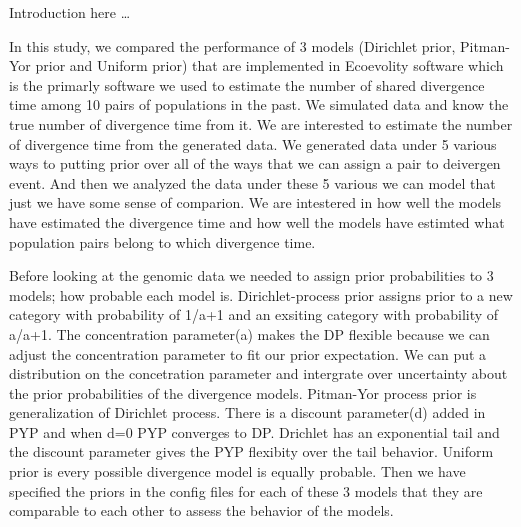 Introduction here \ldots

In this study, we compared the performance of 3 models (Dirichlet prior, Pitman-Yor prior and Uniform prior) 
that are implemented in Ecoevolity software which is the primarly software we used to estimate the number of shared divergence time 
among 10 pairs of populations in the past. We simulated data and know the true number of divergence time from it. We are interested 
to estimate the number of divergence time from the generated data. We generated data under 5 various ways to putting prior over all
 of the ways that we can assign a pair to deivergen event. And then we analyzed the data under these 5 various we can model that 
just we have some sense of comparion. We are intestered in how well the models have estimated the divergence time and how well 
the models have estimted what population pairs belong to which divergence time. 

Before looking at the genomic data we needed to assign prior probabilities to 3 models; how probable each model is. Dirichlet-process prior 
assigns prior to a new category with probability of 1/a+1 and an exsiting category with probability of a/a+1. The concentration parameter(a) 
makes the DP flexible because we can adjust the concentration parameter to fit our prior expectation. We can put a distribution on the 
concetration parameter and intergrate over uncertainty about the prior probabilities of the divergence models. Pitman-Yor process prior is 
generalization of Dirichlet process. There is a discount parameter(d) added in PYP and when d=0 PYP converges to DP. Drichlet has an exponential tail 
and the discount parameter gives the PYP flexibity over the tail behavior. Uniform prior is every possible divergence model is equally probable. 
Then we have specified the priors in the config files for each of these 3 models that they are comparable to each other to assess the behavior of the models. 

